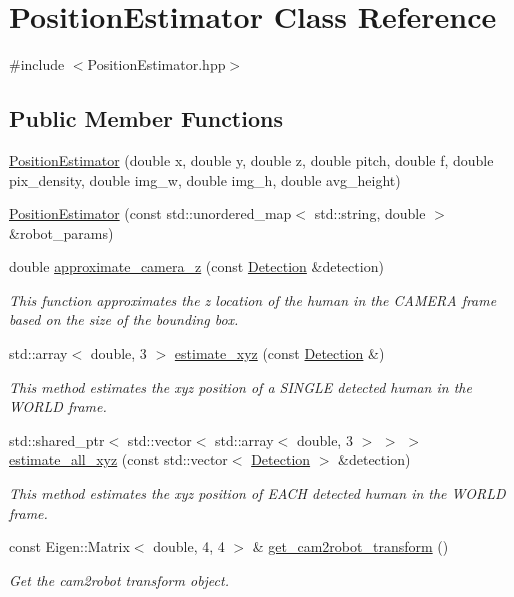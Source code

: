 \hypertarget{class_position_estimator}{}\section{Position\+Estimator Class Reference}
\label{class_position_estimator}


{\ttfamily \#include $<$Position\+Estimator.\+hpp$>$}

\subsection*{Public Member Functions}
\begin{DoxyCompactItemize}
\item 
\hyperlink{class_position_estimator_a162766d49cc6acd2ff0bb59737ec75c9}{Position\+Estimator} (double x, double y, double z, double pitch, double f, double pix\+\_\+density, double img\+\_\+w, double img\+\_\+h, double avg\+\_\+height)
\item 
\hyperlink{class_position_estimator_af0b8305de010b7f15f0b18499d8d50c3}{Position\+Estimator} (const std\+::unordered\+\_\+map$<$ std\+::string, double $>$ \&robot\+\_\+params)
\item 
double \hyperlink{class_position_estimator_a4af8448b844393e6320d3570868f1aaa}{approximate\+\_\+camera\+\_\+z} (const \hyperlink{struct_detection}{Detection} \&detection)
\begin{DoxyCompactList}\small\item\em This function approximates the z location of the human in the C\+A\+M\+E\+RA frame based on the size of the bounding box. \end{DoxyCompactList}\item 
std\+::array$<$ double, 3 $>$ \hyperlink{class_position_estimator_ab7aca1c0fa82d6836ae698ebe0826edd}{estimate\+\_\+xyz} (const \hyperlink{struct_detection}{Detection} \&)
\begin{DoxyCompactList}\small\item\em This method estimates the xyz position of a S\+I\+N\+G\+LE detected human in the W\+O\+R\+LD frame. \end{DoxyCompactList}\item 
std\+::shared\+\_\+ptr$<$ std\+::vector$<$ std\+::array$<$ double, 3 $>$ $>$ $>$ \hyperlink{class_position_estimator_a02dafec98e58e3354ac3abb0a5f53153}{estimate\+\_\+all\+\_\+xyz} (const std\+::vector$<$ \hyperlink{struct_detection}{Detection} $>$ \&detection)
\begin{DoxyCompactList}\small\item\em This method estimates the xyz position of E\+A\+CH detected human in the W\+O\+R\+LD frame. \end{DoxyCompactList}\item 
const Eigen\+::\+Matrix$<$ double, 4, 4 $>$ \& \hyperlink{class_position_estimator_a12ae9fe6ea2f7ca1e2054e018c5dabf5}{get\+\_\+cam2robot\+\_\+transform} ()
\begin{DoxyCompactList}\small\item\em Get the cam2robot transform object. \end{DoxyCompactList}\end{DoxyCompactItemize}


